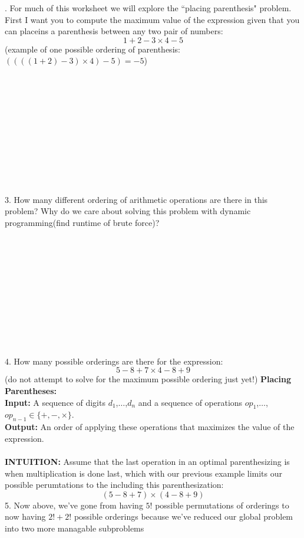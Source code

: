 \documentclass[12pt]{article}
\begin{document}
\newpage
{}. For much of this worksheet we will explore the ``placing parenthesis" problem. First
I want you to compute the maximum value of the expression given that you can placeins
a parenthesis between any two pair of numbers:\\
$$1+2-3 \times 4-5$$
(example of one possible ordering of parenthesis:$((((1+2)-3) \times 4)-5)=-5$)\\\\\\\\\\\\\\\\\\\\\\\\
3. How many different ordering of arithmetic operations are there in this problem? 
Why do we care about solving this problem with dynamic programming(find runtime of brute force)?\\\\\\\\\\\\\\\\\\\\\\\\
4. How many possible orderings are there for the expression: $$5-8+7 \times 4 - 8 + 9$$ 
(do not attempt to solve for the maximum possible ordering just yet!)
\newpage
\noindent \textbf{Placing Parentheses:}\\
\textbf{Input:} A sequence of digits $d_1$,$\dots$,$d_n$ and a sequence of operations $op_1$,$\dots$,$op_{n-1} \in \{ +,-,\times \}$.\\
\textbf{Output:} An order of applying these operations that maximizes the value of the expression.\\\\
\textbf{INTUITION:} Assume that the last operation in an optimal parenthesizing 
is when multiplication is done last, which with our previous example limits our possible
perumtations to the including this parenthesization:
$$(5-8+7) \times (4 - 8 + 9)$$
5. Now above, we've gone from having $5!$ possible
permutations of orderings to now having $2! + 2!$ possible orderings
because we've reduced our global problem into two more managable subproblems
\end{document}
